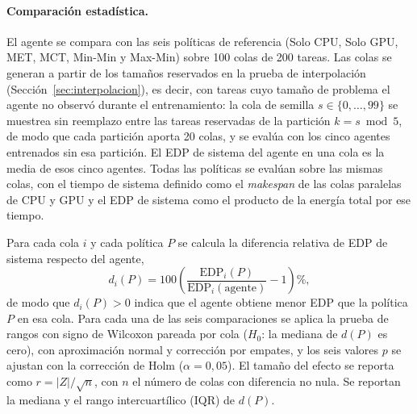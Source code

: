 


\paragraph{Comparación estadística.}
El agente se compara con las seis políticas de referencia (Solo CPU, Solo GPU, MET,
MCT, Min-Min y Max-Min) sobre 100 colas de 200 tareas. Las colas se generan a partir
de los tamaños reservados en la prueba de interpolación (Sección~\ref{sec:interpolacion}),
es decir, con tareas cuyo tamaño de problema el agente no observó durante el
entrenamiento: la cola de semilla $s \in \{0, \dots, 99\}$ se muestrea sin reemplazo
entre las tareas reservadas de la partición $k = s \bmod 5$, de modo que cada partición
aporta 20 colas, y se evalúa con los cinco agentes entrenados sin esa partición. El EDP
de sistema del agente en una cola es la media de esos cinco agentes. Todas las políticas
se evalúan sobre las mismas colas, con el tiempo de sistema definido como el
\textit{makespan} de las colas paralelas de CPU y GPU y el EDP de sistema como el producto
de la energía total por ese tiempo.

Para cada cola $i$ y cada política $P$ se calcula la diferencia relativa de EDP de sistema
respecto del agente,
\begin{equation}
  d_{i}(P) = 100 \left( \frac{\mathrm{EDP}_{i}(P)}{\mathrm{EDP}_{i}(\text{agente})} - 1 \right) \%,
\end{equation}
de modo que $d_{i}(P) > 0$ indica que el agente obtiene menor EDP que la política $P$ en
esa cola. Para cada una de las seis comparaciones se aplica la prueba de rangos con signo
de Wilcoxon pareada por cola ($H_0$: la mediana de $d(P)$ es cero), con aproximación normal
y corrección por empates, y los seis valores $p$ se ajustan con la corrección de Holm
($\alpha = 0{,}05$). El tamaño del efecto se reporta como $r = |Z|/\sqrt{n}$, con $n$ el
número de colas con diferencia no nula. Se reportan la mediana y el rango intercuartílico
(IQR) de $d(P)$.

